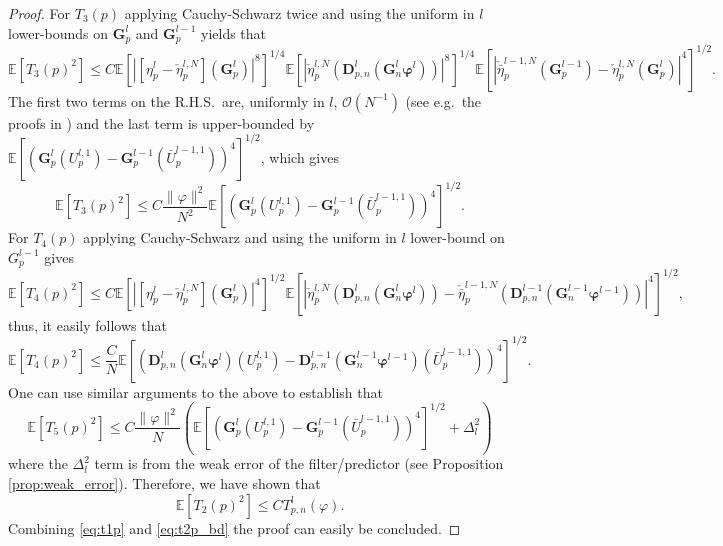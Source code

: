 \documentclass[english]{article}
\begin{document}
\begin{proof}
For $T_3(p)$ applying Cauchy-Schwarz twice and using the uniform in $l$ lower-bounds on $\mathbf{G}_p^l$ and $\mathbf{G}_p^{l-1}$ yields that
$$
\mathbb{E}[T_3(p)^2] \leq C\mathbb{E}[|[\eta_p^l-\check{\eta}_p^{l,N}](\mathbf{G}_p^l)|^8]^{1/4}
\mathbb{E}[|\check{\eta}_p^{l,N}(\mathbf{D}_{p,n}^l(\mathbf{G}_n^l\pmb{\varphi}^l))|^8]^{1/4}
\mathbb{E}[|\check{\bar{\eta}}_p^{l-1,N}(\mathbf{G}_p^{l-1})-\check{\eta}_p^{l,N}(\mathbf{G}_p^l)|^{4}]^{1/2}.
$$
The first two terms on the R.H.S.~are, uniformly in $l$, $\mathcal{O}(N^{-1})$ (see e.g.~the proofs in \cite[Appendix A.5]{jasra}) and the last term is upper-bounded by $\mathbb{E}[(\mathbf{G}_{p}^l(U_p^{l,1})-\mathbf{G}_{p}^{l-1}(\bar{U}_p^{l-1,1}))^4]^{1/2}$, which gives
$$
\mathbb{E}[T_3(p)^2] \leq C\frac{\|\varphi\|^2}{N^2}\mathbb{E}[(\mathbf{G}_{p}^l(U_p^{l,1})-\mathbf{G}_{p}^{l-1}(\bar{U}_p^{l-1,1}))^4]^{1/2}.
$$
For $T_4(p)$ applying Cauchy-Schwarz and using the uniform in $l$ lower-bound on $G_p^{l-1}$ gives
$$
\mathbb{E}[T_4(p)^2] \leq C\mathbb{E}[|[\eta_p^l-\check{\eta}_p^{l,N}](\mathbf{G}_p^l)|^4]^{1/2}
\mathbb{E}[|\check{\eta}_p^{l,N}(\mathbf{D}_{p,n}^l(\mathbf{G}_n^l\pmb{\varphi}^l))-\check{\bar{\eta}}_p^{l-1,N}(\mathbf{D}_{p,n}^{l-1}(\mathbf{G}_n^{l-1}\pmb{\varphi}^{l-1}))|^4]^{1/2},
$$
thus, it easily follows that
$$
\mathbb{E}[T_4(p)^2] \leq \frac{C}{N}\mathbb{E}[(\mathbf{D}_{p,n}^l(\mathbf{G}_n^l\pmb{\varphi}^l)(U_p^{l,1})- \mathbf{D}_{p,n}^{l-1}(\mathbf{G}_n^{l-1}\pmb{\varphi}^{l-1})(\bar{U}_p^{l-1,1}))^4]^{1/2}.
$$
One can use similar arguments to the above to establish that
$$
\mathbb{E}[T_5(p)^2] \leq C\frac{\|\varphi\|^2}{N}\left(\mathbb{E}[(\mathbf{G}_{p}^l(U_p^{l,1})-\mathbf{G}_{p}^{l-1}(\bar{U}_p^{l-1,1}))^4]^{1/2} + \Delta_l^2\right)
$$
where the $\Delta_l^2$ term is from the weak error of the filter/predictor (see Proposition \ref{prop:weak_error}).
Therefore, we have shown that
\begin{equation}\label{eq:t2p_bd}
\mathbb{E}[T_2(p)^2] \leq C T_{p,n}^l(\varphi).
\end{equation}
Combining \eqref{eq:t1p} and \eqref{eq:t2p_bd} the proof can easily be concluded.
\end{proof}
\end{document}
